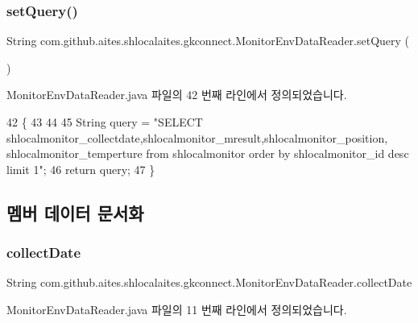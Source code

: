 \subsubsection{\texorpdfstring{set\+Query()}{setQuery()}}
{\footnotesize\ttfamily String com.\+github.\+aites.\+shlocalaites.\+gkconnect.\+Monitor\+Env\+Data\+Reader.\+set\+Query (\begin{DoxyParamCaption}{ }\end{DoxyParamCaption})}



Monitor\+Env\+Data\+Reader.\+java 파일의 42 번째 라인에서 정의되었습니다.


\begin{DoxyCode}
42                              \{
43         
44         
45         String query = \textcolor{stringliteral}{"SELECT shlocalmonitor\_collectdate,shlocalmonitor\_mresult,shlocalmonitor\_position,
       shlocalmonitor\_temperture from shlocalmonitor order by shlocalmonitor\_id desc limit 1"};
46         \textcolor{keywordflow}{return} query;
47     \}
\end{DoxyCode}


\subsection{멤버 데이터 문서화}
\mbox{\label{classcom_1_1github_1_1aites_1_1shlocalaites_1_1gkconnect_1_1_monitor_env_data_reader_ab0434b101af5a74c787e1e7c8b9df81e}} 
\subsubsection{\texorpdfstring{collect\+Date}{collectDate}}
{\footnotesize\ttfamily String com.\+github.\+aites.\+shlocalaites.\+gkconnect.\+Monitor\+Env\+Data\+Reader.\+collect\+Date\hspace{0.3cm}{\ttfamily [private]}}



Monitor\+Env\+Data\+Reader.\+java 파일의 11 번째 라인에서 정의되었습니다.

